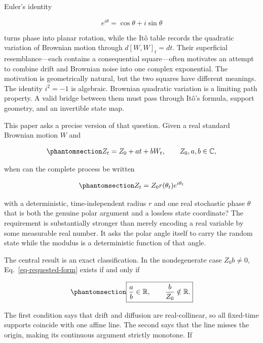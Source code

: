 \documentclass[
  english,
  10pt,
  letterpaper,
  DIV=11,
  numbers=noendperiod]{scrartcl}
\theoremstyle{definition}
\theoremstyle{plain}
\theoremstyle{plain}
\theoremstyle{remark}
\begin{document}
Euler's identity

\[
e^{i\theta}=\cos\theta+i\sin\theta
\]

turns phase into planar rotation, while the Itô table records the
quadratic variation of Brownian motion through \(d[W,W]_t=dt\). Their
superficial resemblance---each contains a consequential square---often
motivates an attempt to combine drift and Brownian noise into one
complex exponential. The motivation is geometrically natural, but the
two squares have different meanings. The identity \(i^2=-1\) is
algebraic. Brownian quadratic variation is a limiting path property. A
valid bridge between them must pass through Itô's formula, support
geometry, and an invertible state map.

This paper asks a precise version of that question. Given a real
standard Brownian motion \(W\) and

\begin{equation}\protect\phantomsection\label{eq-affine-process}{
Z_t=Z_0+at+bW_t,\qquad Z_0,a,b\in\mathbb C,
}\end{equation}

when can the complete process be written

\begin{equation}\protect\phantomsection\label{eq-requested-form}{
Z_t=Z_0r(\theta_t)e^{i\theta_t}
}\end{equation}

with a deterministic, time-independent radius \(r\) and one real
stochastic phase \(\theta\) that is both the genuine polar argument and
a lossless state coordinate? The requirement is substantially stronger
than merely encoding a real variable by some measurable real number. It
asks the polar angle itself to carry the random state while the modulus
is a deterministic function of that angle.

The central result is an exact classification. In the nondegenerate case
\(Z_0b\ne0\), Eq.~\ref{eq-requested-form} exists if and only if

\begin{equation}\protect\phantomsection\label{eq-classification-preview}{
\boxed{
\frac{a}{b}\in\mathbb R,
\qquad
\frac{b}{Z_0}\notin\mathbb R.
}
}\end{equation}

The first condition says that drift and diffusion are real-collinear, so
all fixed-time supports coincide with one affine line. The second says
that the line misses the origin, making its continuous argument strictly
monotone. If
\end{document}
